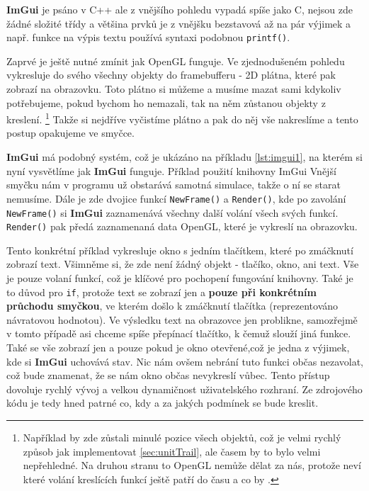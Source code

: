 \textbf{ImGui} je psáno v C++ ale z vnějšího pohledu vypadá spíše jako C, nejsou zde žádné složité třídy a většina prvků je z vnějšku bezstavová až na pár výjimek a např. funkce na výpis textu používá syntaxi podobnou \texttt{printf()}.

Zaprvé je ještě nutné zmínit jak OpenGL funguje. Ve zjednodušeném pohledu vykresluje do svého všechny objekty do framebufferu - 2D plátna, které pak zobrazí na obrazovku. Toto plátno si můžeme a musíme mazat sami kdykoliv potřebujeme, pokud bychom ho nemazali, tak na něm zůstanou objekty z  kreslení.
\footnote{Například by zde zůstali minulé pozice všech objektů, což je velmi rychlý způsob jak implementovat \ref{sec:unitTrail}, ale časem by to bylo velmi nepřehledné. Na druhou stranu to OpenGL nemůže dělat za nás, protože neví které volání kreslících funkcí ještě patří do  času a co by .} Takže si nejdříve vyčistíme plátno a pak do něj vše nakreslíme a tento postup opakujeme ve smyčce.

\textbf{ImGui} má podobný systém, což je ukázáno na příkladu \ref{lst:imgui1}, na kterém si nyní vysvětlíme jak \textbf{ImGui} funguje.
{Příklad použití knihovny ImGui }
Vnější smyčku nám v programu už obstarává samotná simulace, takže o ní se starat nemusíme. Dále je zde dvojice funkcí \texttt{NewFrame()} a \texttt{Render()}, kde po zavolání \texttt{NewFrame()} si \textbf{ImGui} zaznamenává všechny další volání všech svých funkcí. \texttt{Render()} pak předá zaznamenaná data OpenGL, které je vykreslí na obrazovku. 

Tento konkrétní příklad vykresluje okno s jedním tlačítkem, které po zmáčknutí zobrazí text. Všimněme si, že zde není žádný objekt - tlačíko, okno, ani text. Vše je pouze volaní funkcí, což je klíčové pro pochopení fungování knihovny. Také je to důvod pro \texttt{if}, protože  text se zobrazí jen a \textbf{pouze při konkrétním průchodu smyčkou}, ve kterém došlo k zmáčknutí tlačítka (reprezentováno návratovou hodnotou). Ve výsledku text na obrazovce jen problikne, samozřejmě v tomto případě asi chceme spíše přepínací tlačítko, k čemuž slouží jiná funkce. Také se vše zobrazí jen a pouze pokud je okno otevřené,což je jedna z výjimek, kde si \textbf{ImGui} uchovává stav. Nic nám ovšem nebrání tuto funkci občas nezavolat, což bude znamenat, že se nám okno občas nevykreslí vůbec. Tento přístup dovoluje rychlý vývoj a velkou dynamičnost uživatelského rozhraní. Ze zdrojového kódu je tedy hned patrné co, kdy a za jakých podmínek se bude kreslit.

